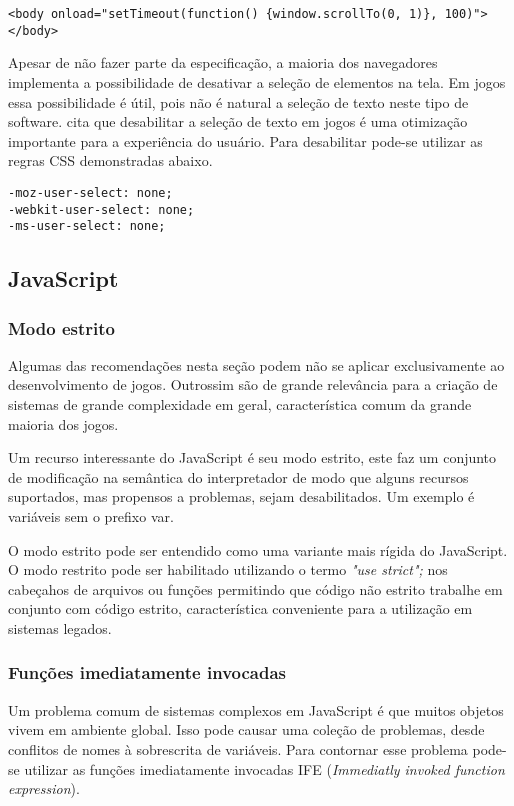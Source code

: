 \begin{draft}
\begin{verbatim}
<body onload="setTimeout(function() {window.scrollTo(0, 1)}, 100)">
</body>
\end{verbatim}

Apesar de não fazer parte da especificação, a maioria dos navegadores
implementa a possibilidade de desativar a seleção de elementos na tela.
Em jogos essa possibilidade é útil, pois não é natural a seleção de texto
neste tipo de software. \cite{html5mostwanted} cita que desabilitar
a seleção de texto em jogos é uma otimização importante para a
experiência do usuário. Para desabilitar pode-se utilizar as regras
CSS demonstradas abaixo.

\begin{verbatim}
-moz-user-select: none;
-webkit-user-select: none;
-ms-user-select: none;
\end{verbatim}

\subsection{JavaScript}

\subsubsection{Modo estrito}
Algumas das recomendações nesta seção podem não se aplicar
exclusivamente ao desenvolvimento de jogos. Outrossim são de grande
relevância para a criação de sistemas de grande complexidade em geral,
característica comum da grande maioria dos jogos.

Um recurso interessante do JavaScript é seu modo estrito, este faz
um conjunto de modificação na semântica do interpretador de modo
que alguns recursos suportados, mas propensos a problemas, sejam
desabilitados. Um exemplo é variáveis sem o prefixo var.

O modo estrito pode ser entendido como uma variante mais rígida
do JavaScript. O modo restrito pode ser habilitado utilizando o
termo \textit{"use strict";} nos cabeçahos de arquivos ou funções
permitindo que código não estrito trabalhe em conjunto com código
estrito, característica conveniente para a utilização em sistemas
legados.

\subsubsection{Funções imediatamente invocadas}

Um problema comum de sistemas complexos em JavaScript é que muitos
objetos vivem em ambiente global. Isso pode causar uma coleção de
problemas, desde conflitos de nomes à sobrescrita de variáveis. Para
contornar esse problema pode-se utilizar as funções imediatamente
invocadas IFE (\textit{Immediatly invoked function expression}).
\end{draft}

